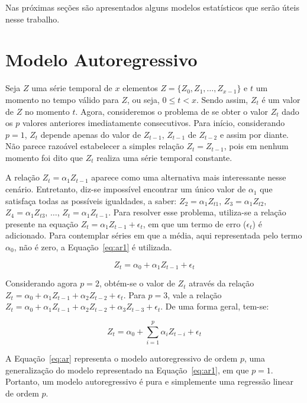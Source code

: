 Nas próximas seções são apresentados alguns modelos estatísticos que serão úteis
nesse trabalho.

\section{Modelo Autoregressivo}

Seja $Z$ uma série temporal de $x$ elementos $Z = \{Z_0, Z_1, \hdots, Z_{x-1}\}$
e $t$ um momento no tempo válido para $Z$, ou seja, $0 \leq t < x$. Sendo assim,
$Z_t$ é um valor de $Z$ no momento $t$. Agora, consideremos o problema de se obter o valor
$Z_t$ dado os $p$ valores anteriores imediatamente consecutivos. Para início,
considerando $p = 1$, $Z_t$ depende apenas do valor de $Z_{t-1}$, $Z_{t-1}$ de
$Z_{t-2}$ e assim por diante. Não parece razoável estabelecer a simples relação
$Z_{t} = Z_{t-1}$, pois em nenhum momento foi dito que $Z_t$ realiza uma série
temporal constante.

A relação $Z_t = \alpha_1Z_{t-1}$ aparece como uma alternativa mais
interessante nesse cenário. Entretanto, diz-se impossível encontrar um único
valor de $\alpha_1$ que satisfaça todas as possíveis igualdades, a saber:
$Z_2 = \alpha_1Z_{t1}$, $Z_3 = \alpha_1Z_{t2}$, $Z_4 = \alpha_1Z_{t3}$,
$\hdots$, $Z_t = \alpha_1Z_{t-1}$. Para resolver esse problema, utiliza-se
a relação presente na equação $Z_t = \alpha_1Z_{t-1} +
\epsilon_t$, em que um termo de erro ($\epsilon_t$) é adicionado. Para
contemplar séries em que a média, aqui representada pelo termo $\alpha_0$, não é
zero, a Equação~\ref{eq:ar1} é utilizada.

\begin{equation}
Z_t = \alpha_0 + \alpha_1Z_{t-1} + \epsilon_t
\label{eq:ar1} 
\end{equation}

Considerando agora $p=2$, obtém-se o valor de $Z_t$ através da relação $Z_t =
\alpha_0 + \alpha_1Z_{t-1} + \alpha_2Z_{t-2} + \epsilon_t$. Para $p=3$, vale a
relação $Z_t = \alpha_0 + \alpha_1Z_{t-1} + \alpha_2Z_{t-2} + \alpha_3Z_{t-3} +
\epsilon_t$. De uma forma geral, tem-se:

\begin{equation}
\displaystyle Z_t = \alpha_0 + \sum_{i=1}^p \alpha_iZ_{t-i} + \epsilon_t
\label{eq:ar} 
\end{equation}
 
A Equação~\ref{eq:ar} representa o modelo autoregressivo de ordem $p$, uma
generalização do modelo representado na Equação~\ref{eq:ar1}, em que $p=1$.
Portanto, um modelo autoregressivo é pura e simplemente uma regressão linear de
ordem $p$.

